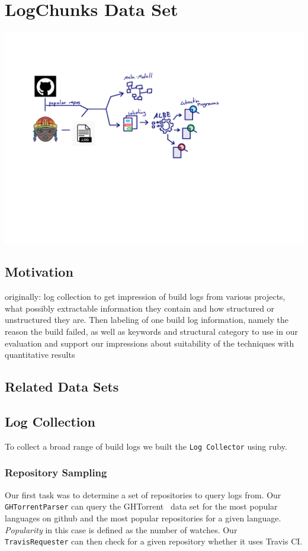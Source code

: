 \documentclass[\myrootdir/main.tex]{subfiles}
\begin{document}
\chapter{LogChunks Data Set}
\includegraphics[page=5, width=\textwidth, trim={0.5cm 0.5cm 0.5cm 0.5cm}, clip]{img/flow-of-research.pdf}

\label{sec:data-set}
\section{Motivation}
originally: log collection to get impression of build logs from various projects, what possibly extractable information they contain and how structured or unstructured they are.
Then labeling of one build log information, namely the reason the build failed, as well as keywords and structural category to use in our evaluation and support our impressions about suitability of the techniques with quantitative results

\section{Related Data Sets}

\section{Log Collection}
To collect a broad range of build logs we built the \texttt{Log Collector} using ruby.

\subsection{Repository Sampling}
Our first task was to determine a set of repositories to query logs from.
Our \texttt{GHTorrentParser} can query the GHTorrent~\cite{gousios2013ghtorrent} data set for the most popular languages on github and the most popular repositories for a given language.
\emph{Popularity} in this case is defined as the number of watches.
Our \texttt{TravisRequester} can then check for a given repository whether it uses Travis CI.
\end{document}
